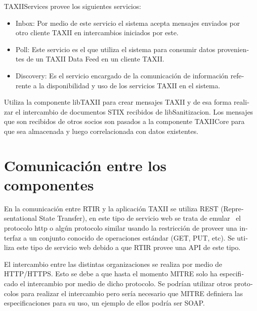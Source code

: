 	\foreignlanguage{spanish}{TAXIIServices provee los siguientes servicios:}
	
	\begin{itemize}
		\item \foreignlanguage{spanish}{Inbox: Por medio de este servicio el sistema acepta mensajes enviados por otro cliente
			TAXII en intercambios iniciados por este. }
		\item \foreignlanguage{spanish}{Poll: Este servicio es el que utiliza el sistema para consumir datos provenientes de un
			TAXII Data Feed en un cliente TAXII.}
		\item \foreignlanguage{spanish}{Discovery: Es el servicio encargado de la comunicación de información referente a la
			disponibilidad y uso de los servicios TAXII en el sistema.}
	\end{itemize}
	
	\bigskip
	
	\foreignlanguage{spanish}{Utiliza la componente libTAXII para crear mensajes TAXII y de esa forma realizar el
		intercambio de documentos STIX recibidos de libSanitizacion. Los mensajes que son recibidos de otros socios son pasados
		a la componente TAXIICore para que sea almacenada y luego correlacionada con datos existentes. }
	
	
	\bigskip
	
	\section[Comunicación entre los componentes]{\foreignlanguage{spanish}{Comunicación entre los componentes}}
	
	\bigskip
	
	\foreignlanguage{spanish}{En la comunicación entre RTIR y la aplicación TAXII se utiliza REST (Representational State
		Transfer), en este tipo de servicio web se trata de emular \ el protocolo http o algún protocolo similar usando la
		restricción de proveer una interfaz a un conjunto conocido de operaciones estándar (GET, PUT, etc). Se utiliza este
		tipo de servicio web debido a que RTIR provee una API de este tipo. }
	
	
	\bigskip
	
	\foreignlanguage{spanish}{El intercambio entre las distintas organizaciones se realiza por medio de HTTP/HTTPS. Esto se
		debe a que hasta el momento MITRE solo ha especificado el intercambio por medio de dicho protocolo. Se podrían utilizar
		otros protocolos para realizar el intercambio pero sería necesario que MITRE definiera las especificaciones para su
		uso, un ejemplo de ellos podría ser SOAP.}
	
